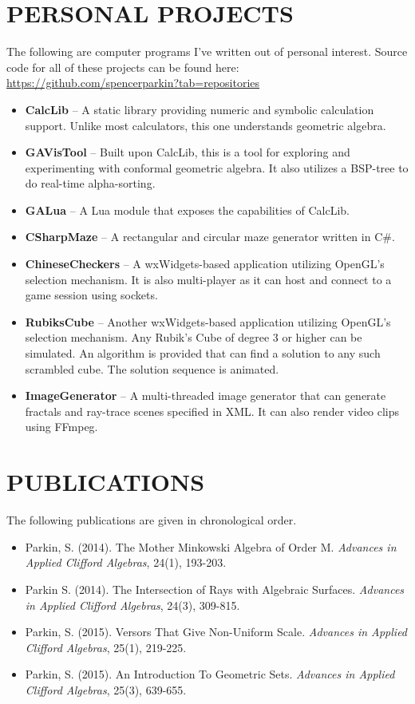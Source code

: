 \documentclass[margin]{res}
\begin{document}
\begin{resume}
\section{PERSONAL PROJECTS}
		The following are computer programs I've written out of personal interest.  Source code for all of these projects can be found here: \url{https://github.com/spencerparkin?tab=repositories}
		\begin{itemize}\itemsep -2pt %
		\item \textbf{CalcLib} -- A static library providing numeric and symbolic calculation support.  Unlike most calculators, this one understands geometric algebra.
		\item \textbf{GAVisTool} -- Built upon CalcLib, this is a tool for exploring and experimenting with conformal geometric algebra.  It also utilizes a BSP-tree to do real-time alpha-sorting.
		\item \textbf{GALua} -- A Lua module that exposes the capabilities of CalcLib.
		\item \textbf{CSharpMaze} -- A rectangular and circular maze generator written in C\#.
		\item \textbf{ChineseCheckers} -- A wxWidgets-based application utilizing OpenGL's selection mechanism.  It is also multi-player as it can host and connect to a game session using sockets.
		\item \textbf{RubiksCube} -- Another wxWidgets-based application utilizing OpenGL's selection mechanism.  Any Rubik's Cube of degree 3 or higher can be simulated.  An algorithm is provided that can find a solution to any such scrambled cube.  The solution sequence is animated.
		\item \textbf{ImageGenerator} -- A multi-threaded image generator that can generate fractals and ray-trace scenes specified in XML.  It can also render video clips using FFmpeg.
		\end{itemize}

\section{PUBLICATIONS}
		The following publications are given in chronological order.
		\begin{itemize}\itemsep -2pt %
		\item Parkin, S. (2014).  The Mother Minkowski Algebra of Order M.  {\it Advances in Applied Clifford Algebras}, 24(1), 193-203.
		\item Parkin S.  (2014).  The Intersection of Rays with Algebraic Surfaces.  {\it Advances in Applied Clifford Algebras}, 24(3), 309-815.
		\item Parkin, S.  (2015).  Versors That Give Non-Uniform Scale.  {\it Advances in Applied Clifford Algebras}, 25(1), 219-225.
		\item Parkin, S.  (2015).  An Introduction To Geometric Sets.  {\it Advances in Applied Clifford Algebras}, 25(3), 639-655.
		\end{itemize}


\end{resume}
\end{document}
